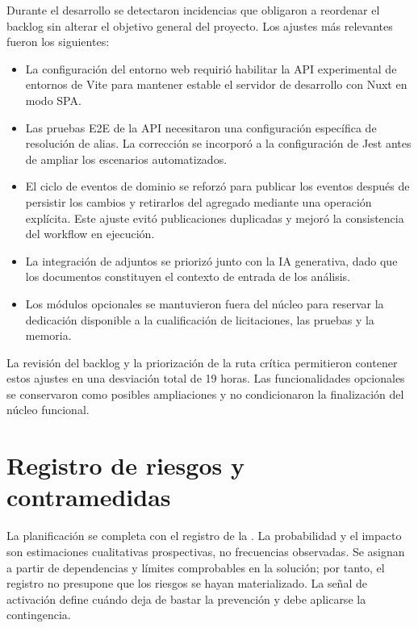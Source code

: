 Durante el desarrollo se detectaron incidencias que obligaron a reordenar el
backlog sin alterar el objetivo general del proyecto. Los ajustes más relevantes
fueron los siguientes:

\begin{itemize}
  \item La configuración del entorno web requirió habilitar la API experimental
        de entornos de Vite para mantener estable el servidor de desarrollo con
        Nuxt en modo SPA.
  \item Las pruebas E2E de la API necesitaron una configuración específica de
        resolución de alias. La corrección se incorporó a la configuración de
        Jest antes de ampliar los escenarios automatizados.
  \item El ciclo de eventos de dominio se reforzó para publicar los eventos
        después de persistir los cambios y retirarlos del agregado mediante una
        operación explícita. Este ajuste evitó publicaciones duplicadas y mejoró
        la consistencia del workflow en ejecución.
  \item La integración de adjuntos se priorizó junto con la IA generativa, dado
        que los documentos constituyen el contexto de entrada de los análisis.
  \item Los módulos opcionales se mantuvieron fuera del núcleo para reservar la
        dedicación disponible a la cualificación de licitaciones, las pruebas y
        la memoria.
\end{itemize}

La revisión del backlog y la priorización de la ruta crítica permitieron
contener estos ajustes en una desviación total de 19 horas. Las funcionalidades
opcionales se conservaron como posibles ampliaciones y no condicionaron la
finalización del núcleo funcional.

\section{Registro de riesgos y contramedidas}
\label{sec:risk-register}

La planificación se completa con el registro de la
. La probabilidad y el impacto son estimaciones
cualitativas prospectivas, no frecuencias observadas. Se asignan a partir de
dependencias y límites comprobables en la solución; por tanto, el registro no
presupone que los riesgos se hayan materializado. La señal de activación define
cuándo deja de bastar la prevención y debe aplicarse la contingencia.

